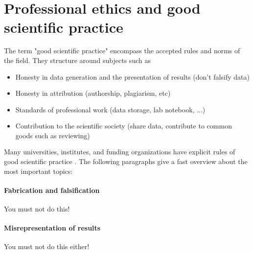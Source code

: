\documentclass{tufte-book}
\begin{document}
\section{Professional ethics and good scientific practice}

The term "good scientific practice" encompass the accepted rules and norms of the field. They structure around subjects such as

\begin{itemize}
\item Honesty in data generation and the presentation of results (don't falsify data)
\item Honesty in attribution (authorship, plagiarism, etc)
\item Standards of professional work (data storage, lab notebook, ...)
\item Contribution to the scientific society (share data, contribute to common goods such as reviewing)
\end{itemize}

Many
 universities, institutes, and funding organizations have explicit rules of good scientific practice \citet[e.g.][]{Forschungsgemeinschaft-RulesGoodScientific-2013}. The following paragraphs give a fast overview about the most important topics:


\paragraph{Fabrication and falsification} You must not do this!

\paragraph{Misrepresentation of results} You must not do this either!
\end{document}
